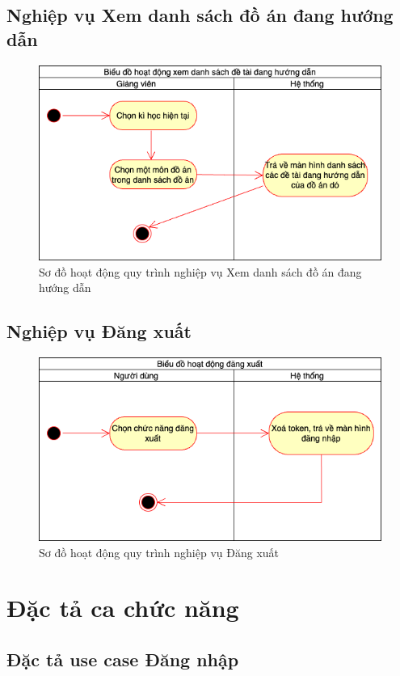\documentclass[../Main.tex]{subfiles}
\begin{document}
\subsection{Nghiệp vụ Xem danh sách đồ án đang hướng dẫn}
\begin{figure}[H]
   \centering
    \includegraphics[width=0.75\linewidth]{Figure/ds_de_tai_dang_hd.png}
    \caption{Sơ đồ hoạt động quy trình nghiệp vụ Xem danh sách đồ án đang hướng dẫn}
    \label{fig:ds_de_tai_dang_hd}
\end{figure}

\subsection{Nghiệp vụ Đăng xuất}
\begin{figure}[H]
   \centering
    \includegraphics[width=0.75\linewidth]{Figure/dang_xuat.png}
    \caption{Sơ đồ hoạt động quy trình nghiệp vụ Đăng xuất}
    \label{fig:dang_xuat}
\end{figure} 
\section{Đặc tả ca chức năng}

\subsection{Đặc tả use case Đăng nhập}
\end{document}
